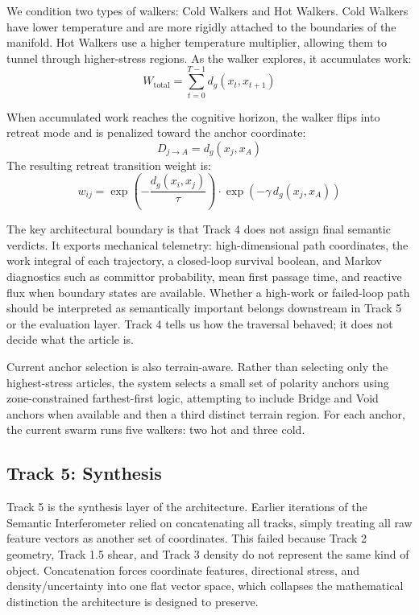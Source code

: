 We condition two types of walkers: Cold Walkers and Hot Walkers. Cold Walkers have lower temperature and are more rigidly attached to the boundaries of the manifold. Hot Walkers use a higher temperature multiplier, allowing them to tunnel through higher-stress regions. As the walker explores, it accumulates work:
\begin{equation}
    W_{\text{total}} = \sum_{t=0}^{T-1} d_g(x_t, x_{t+1})
\end{equation}

When accumulated work reaches the cognitive horizon, the walker flips into retreat mode and is penalized toward the anchor coordinate:
\begin{equation}
    D_{j \to A} = d_g(x_j, x_A)
\end{equation}
The resulting retreat transition weight is:
\begin{equation}
    w_{ij} = \exp\left(-\frac{d_g(x_i,x_j)}{\tau}\right) \cdot \exp\left(-\gamma\, d_g(x_j, x_A)\right)
\end{equation}

The key architectural boundary is that Track 4 does not assign final semantic verdicts. It exports mechanical telemetry: high-dimensional path coordinates, the work integral of each trajectory, a closed-loop survival boolean, and Markov diagnostics such as committor probability, mean first passage time, and reactive flux when boundary states are available. Whether a high-work or failed-loop path should be interpreted as semantically important belongs downstream in Track 5 or the evaluation layer. Track 4 tells us how the traversal behaved; it does not decide what the article is.

Current anchor selection is also terrain-aware. Rather than selecting only the highest-stress articles, the system selects a small set of polarity anchors using zone-constrained farthest-first logic, attempting to include Bridge and Void anchors when available and then a third distinct terrain region. For each anchor, the current swarm runs five walkers: two hot and three cold.

\subsection{Track 5: Synthesis}

Track 5 is the synthesis layer of the architecture. Earlier iterations of the Semantic Interferometer relied on concatenating all tracks, simply treating all raw feature vectors as another set of coordinates. This failed because Track 2 geometry, Track 1.5 shear, and Track 3 density do not represent the same kind of object. Concatenation forces coordinate features, directional stress, and density/uncertainty into one flat vector space, which collapses the mathematical distinction the architecture is designed to preserve.

